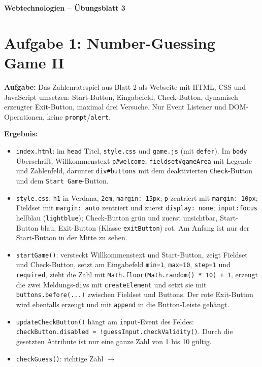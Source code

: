 \documentclass[11pt,a4paper]{article}
\begin{document}
\begin{center}
  {\Large\textbf{Webtechnologien -- Übungsblatt 3}}
\end{center}
\section*{Aufgabe 1: Number-Guessing Game II}
\textbf{Aufgabe:} Das Zahlenratespiel aus Blatt 2 als Webseite mit HTML,
CSS und JavaScript umsetzen: Start-Button, Eingabefeld, Check-Button,
dynamisch erzeugter Exit-Button, maximal drei Versuche. Nur Event Listener
und DOM-Operationen, keine \texttt{prompt}/\texttt{alert}.

\medskip
\textbf{Ergebnis:}
\begin{itemize}
  \item \texttt{index.html}: im \texttt{head} Titel, \texttt{style.css} und
    \texttt{game.js} (mit \texttt{defer}). Im \texttt{body} Überschrift,
    Willkommenstext \texttt{p\#welcome}, \texttt{fieldset\#gameArea} mit
    Legende und Zahlenfeld, darunter \texttt{div\#buttons} mit dem
    deaktivierten \texttt{Check}-Button und dem \texttt{Start Game}-Button.
  \item \texttt{style.css}: \texttt{h1} in Verdana, \texttt{2em},
    \texttt{margin: 15px}; \texttt{p} zentriert mit \texttt{margin: 10px};
    Fieldset mit \texttt{margin: auto} zentriert und zuerst
    \texttt{display: none}; \texttt{input:focus} hellblau
    (\texttt{lightblue}); Check-Button grün und zuerst unsichtbar,
    Start-Button blau, Exit-Button (Klasse \texttt{exitButton}) rot.
    Am Anfang ist nur der Start-Button in der Mitte zu sehen.
  \item \texttt{startGame()}: versteckt Willkommenstext und Start-Button,
    zeigt Fieldset und Check-Button, setzt am Eingabefeld
    \texttt{min=1}, \texttt{max=10}, \texttt{step=1} und
    \texttt{required}, zieht die Zahl mit
    \texttt{Math.floor(Math.random() * 10) + 1}, erzeugt die zwei
    Meldungs-\texttt{div}s mit \texttt{createElement} und setzt sie mit
    \texttt{buttons.before(...)} zwischen Fieldset und Buttons. Der rote
    Exit-Button wird ebenfalls erzeugt und mit \texttt{append} in die
    Button-Leiste gehängt.
  \item \texttt{updateCheckButton()} hängt am \texttt{input}-Event des
    Feldes: \texttt{checkButton.disabled = !guessInput.checkValidity()}.
    Durch die gesetzten Attribute ist nur eine ganze Zahl von 1 bis 10
    gültig.
  \item \texttt{checkGuess()}: richtige Zahl $\rightarrow$

\end{itemize}
\end{document}
